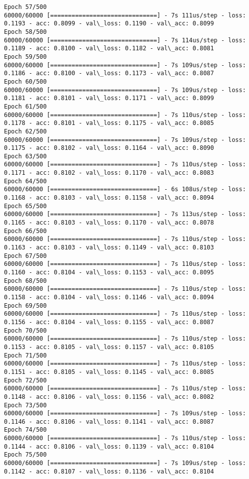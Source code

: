 \documentclass[11pt]{article}
\begin{document}
\begin{Verbatim}[commandchars=\\\{\}]
Epoch 57/500
60000/60000 [==============================] - 7s 111us/step - loss: 0.1193 - acc: 0.8099 - val\_loss: 0.1190 - val\_acc: 0.8099
Epoch 58/500
60000/60000 [==============================] - 7s 114us/step - loss: 0.1189 - acc: 0.8100 - val\_loss: 0.1182 - val\_acc: 0.8081
Epoch 59/500
60000/60000 [==============================] - 7s 109us/step - loss: 0.1186 - acc: 0.8100 - val\_loss: 0.1173 - val\_acc: 0.8087
Epoch 60/500
60000/60000 [==============================] - 7s 109us/step - loss: 0.1181 - acc: 0.8101 - val\_loss: 0.1171 - val\_acc: 0.8099
Epoch 61/500
60000/60000 [==============================] - 7s 110us/step - loss: 0.1178 - acc: 0.8101 - val\_loss: 0.1175 - val\_acc: 0.8085
Epoch 62/500
60000/60000 [==============================] - 7s 109us/step - loss: 0.1175 - acc: 0.8102 - val\_loss: 0.1164 - val\_acc: 0.8090
Epoch 63/500
60000/60000 [==============================] - 7s 110us/step - loss: 0.1171 - acc: 0.8102 - val\_loss: 0.1170 - val\_acc: 0.8083
Epoch 64/500
60000/60000 [==============================] - 6s 108us/step - loss: 0.1168 - acc: 0.8103 - val\_loss: 0.1158 - val\_acc: 0.8094
Epoch 65/500
60000/60000 [==============================] - 7s 113us/step - loss: 0.1165 - acc: 0.8103 - val\_loss: 0.1170 - val\_acc: 0.8078
Epoch 66/500
60000/60000 [==============================] - 7s 110us/step - loss: 0.1163 - acc: 0.8103 - val\_loss: 0.1149 - val\_acc: 0.8103
Epoch 67/500
60000/60000 [==============================] - 7s 110us/step - loss: 0.1160 - acc: 0.8104 - val\_loss: 0.1153 - val\_acc: 0.8095
Epoch 68/500
60000/60000 [==============================] - 7s 110us/step - loss: 0.1158 - acc: 0.8104 - val\_loss: 0.1146 - val\_acc: 0.8094
Epoch 69/500
60000/60000 [==============================] - 7s 110us/step - loss: 0.1156 - acc: 0.8104 - val\_loss: 0.1155 - val\_acc: 0.8087
Epoch 70/500
60000/60000 [==============================] - 7s 110us/step - loss: 0.1153 - acc: 0.8105 - val\_loss: 0.1157 - val\_acc: 0.8105
Epoch 71/500
60000/60000 [==============================] - 7s 110us/step - loss: 0.1151 - acc: 0.8105 - val\_loss: 0.1145 - val\_acc: 0.8085
Epoch 72/500
60000/60000 [==============================] - 7s 110us/step - loss: 0.1148 - acc: 0.8106 - val\_loss: 0.1156 - val\_acc: 0.8082
Epoch 73/500
60000/60000 [==============================] - 7s 109us/step - loss: 0.1146 - acc: 0.8106 - val\_loss: 0.1141 - val\_acc: 0.8087
Epoch 74/500
60000/60000 [==============================] - 7s 110us/step - loss: 0.1144 - acc: 0.8106 - val\_loss: 0.1139 - val\_acc: 0.8104
Epoch 75/500
60000/60000 [==============================] - 7s 109us/step - loss: 0.1142 - acc: 0.8107 - val\_loss: 0.1136 - val\_acc: 0.8104

\end{Verbatim}
\end{document}
